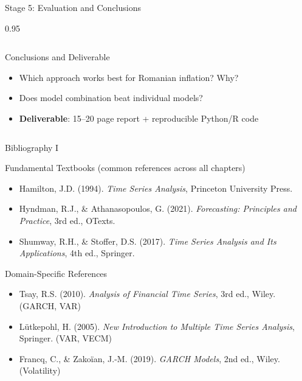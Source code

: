 \documentclass[9pt, aspectratio=169, t]{beamer}
\begin{document}
\begin{frame}{Stage 5: Evaluation and Conclusions}
\begin{cminipage}{0.95\textwidth}
{\begin{columns}[T]
            \begin{alertblock}{Conclusions and Deliverable}
                \begin{itemize}\setlength{\itemsep}{0pt}
                    \item Which approach works best for Romanian inflation? Why?
                    \item Does model combination beat individual models?
                    \item \textbf{Deliverable}: 15--20 page report + reproducible Python/R code
                \end{itemize}
            \end{alertblock}
        \end{columns}
        }
    \end{cminipage}
\end{frame}

\begin{frame}{Bibliography I}
    \begin{block}{Fundamental Textbooks (common references across all chapters)}
        {\small
        \begin{itemize}
            \item Hamilton, J.D. (1994). \textit{Time Series Analysis}, Princeton University Press.
            \item Hyndman, R.J., \& Athanasopoulos, G. (2021). \textit{Forecasting: Principles and Practice}, 3rd ed., OTexts.
            \item Shumway, R.H., \& Stoffer, D.S. (2017). \textit{Time Series Analysis and Its Applications}, 4th ed., Springer.
        \end{itemize}
        }
    \end{block}

    \begin{exampleblock}{Domain-Specific References}
        {\small
        \begin{itemize}
            \item Tsay, R.S. (2010). \textit{Analysis of Financial Time Series}, 3rd ed., Wiley. (GARCH, VAR)
            \item Lütkepohl, H. (2005). \textit{New Introduction to Multiple Time Series Analysis}, Springer. (VAR, VECM)
            \item Francq, C., \& Zakoïan, J.-M. (2019). \textit{GARCH Models}, 2nd ed., Wiley. (Volatility)
        \end{itemize}
        }
    \end{exampleblock}
\end{frame}
\end{document}
